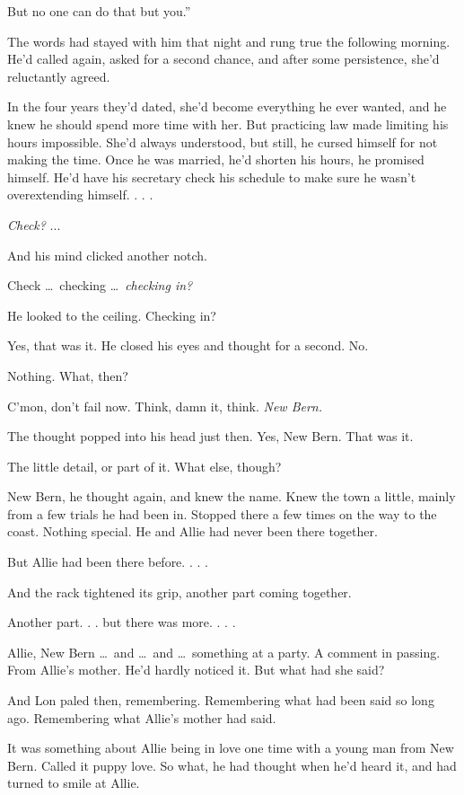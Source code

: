 \documentclass[10pt, twoside, openright]{book}
\begin{document}
But no one can do that but you.''

The words had stayed with him that night and rung true the following
morning. He'd called again, asked for a second chance, and after some
persistence, she'd reluctantly agreed.

In the four years they'd dated, she'd become everything he ever wanted,
and he knew he should spend more time with her. But practicing law made
limiting his hours impossible. She'd always understood, but still, he
cursed himself for not making the time. Once he was married, he'd
shorten his hours, he promised himself. He'd have his secretary check
his schedule to make sure he wasn't overextending himself. . . .


\emph{Check?} ...

And his mind clicked another notch.

Check   \dots\ checking   \dots\ \emph{checking in?}

He looked to the ceiling. Checking in?

Yes, that was it. He closed his eyes and thought for a second. No.


Nothing. What, then?


C'mon, don't fail now. Think, damn it, think. \emph{New Bern.}

The thought popped into his head just then. Yes, New Bern. That was it.


The little detail, or part of it. What else, though?

New Bern, he thought again, and knew the name. Knew the town a little,
mainly from a few trials he had been in. Stopped there a few times on
the way to the coast. Nothing special. He and Allie had never been there
together.


But Allie had been there before. . . .

And the rack tightened its grip, another part coming together.

Another part. . . but there was more. . . .


Allie, New Bern   \dots\ and   \dots\ and   \dots\ something at a party. A
comment in passing. From Allie's mother. He'd hardly noticed it. But
what had she said?

And Lon paled then, remembering. Remembering what had been said so long
ago. Remembering what Allie's mother had said.

It was something about Allie being in love one time with a young man
from New Bern. Called it puppy love. So what, he had thought when he'd
heard it, and had turned to smile at Allie.
\end{document}
